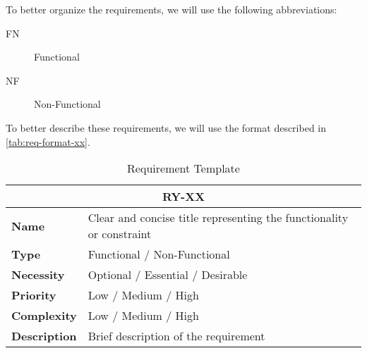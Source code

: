 To better organize the requirements, we will use the following abbreviations:

\begin{description}
    \item[FN]  Functional
    \item[NF]  Non-Functional
\end{description}


To better describe these requirements, we will use the format described in \autoref{tab:req-format-xx}.


\begin{table}[H]
    \centering
    \begin{tabular}{l p{10cm}}
        \toprule
        \multicolumn{2}{c}{\textbf{RY-XX}} \\
        \toprule
        \textbf{Name}               & Clear and concise title representing the functionality or constraint \\
        \textbf{Type}               & Functional / Non-Functional \\
        \textbf{Necessity}          & Optional / Essential / Desirable \\
        \textbf{Priority}           & Low / Medium / High \\
        \textbf{Complexity}         & Low / Medium / High \\
        \textbf{Description}        & Brief description of the requirement \\
        \bottomrule
    \end{tabular}
\caption{Requirement Template}\label{tab:req-format-xx}
\end{table}


